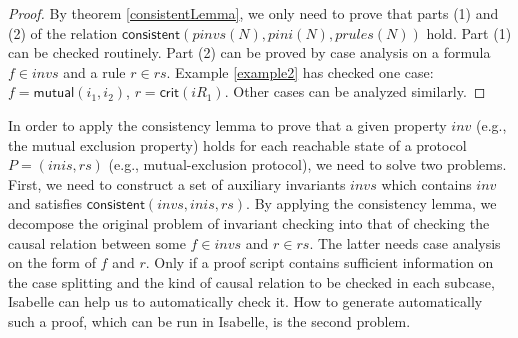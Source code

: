 \documentclass[conference]{IEEEtran}
\begin{document}
\begin{proof} By theorem \ref{consistentLemma}, we only need
to prove that parts (1) and (2) of
 the relation $\mathsf{consistent}( pinvs(N), pini(N), prules(N))$   hold. Part (1) can be checked routinely. Part (2) can be proved by case analysis on a formula $f\in invs$ and a rule $r \in rs$. Example \ref{example2} has checked one case: $f=\mathsf{mutual} (i_1,i_2)$, $r=\mathsf{crit}(iR_1)$. Other cases can be analyzed similarly.
 \end{proof}


In order to  apply the consistency lemma to prove that a given property $inv$ (e.g., the mutual exclusion property) holds for each reachable state of a protocol $P=(inis,rs)$ (e.g., mutual-exclusion protocol), we need to solve two problems. First, we need to construct a set of auxiliary invariants $invs$ which contains $inv$ and satisfies  $\mathsf{consistent}( invs, inis, rs)$.  By applying the consistency lemma, we  decompose the original problem of invariant checking into that of checking the causal relation between some $f\in invs$ and $r \in rs$. The latter needs   case analysis on the form of $f$ and $r$.  Only if a proof script contains sufficient information on the case splitting and  the kind of causal relation to be checked in each subcase, Isabelle can help us to automatically  check it. How to  generate automatically such a proof, which can be run in Isabelle, is the second problem.

\end{document}

